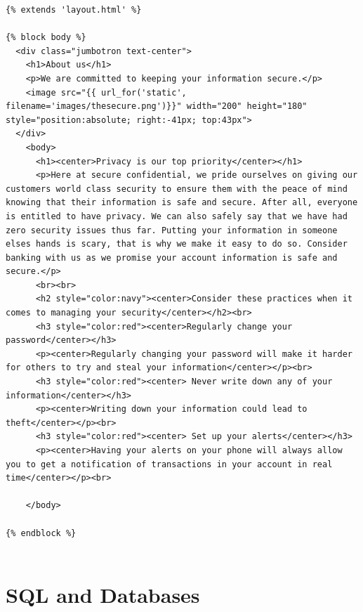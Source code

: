 \bigskip
\bigskip
\begin{lstlisting}
{% extends 'layout.html' %}

{% block body %}
  <div class="jumbotron text-center">
    <h1>About us</h1>
    <p>We are committed to keeping your information secure.</p>
    <image src="{{ url_for('static', filename='images/thesecure.png')}}" width="200" height="180" style="position:absolute; right:-41px; top:43px">
  </div>
    <body>
      <h1><center>Privacy is our top priority</center></h1>
      <p>Here at secure confidential, we pride ourselves on giving our customers world class security to ensure them with the peace of mind knowing that their information is safe and secure. After all, everyone is entitled to have privacy. We can also safely say that we have had zero security issues thus far. Putting your information in someone elses hands is scary, that is why we make it easy to do so. Consider banking with us as we promise your account information is safe and secure.</p>
      <br><br>
      <h2 style="color:navy"><center>Consider these practices when it comes to managing your security</center></h2><br>
      <h3 style="color:red"><center>Regularly change your password</center></h3>
      <p><center>Regularly changing your password will make it harder for others to try and steal your information</center></p><br>
      <h3 style="color:red"><center> Never write down any of your information</center></h3>
      <p><center>Writing down your information could lead to theft</center></p><br>
      <h3 style="color:red"><center> Set up your alerts</center></h3>
      <p><center>Having your alerts on your phone will always allow you to get a notification of transactions in your account in real time</center></p><br>

    </body>

{% endblock %}


\end{lstlisting}
\bigskip
\bigskip

\section{SQL and Databases}
\label{sec:sql and databases}


